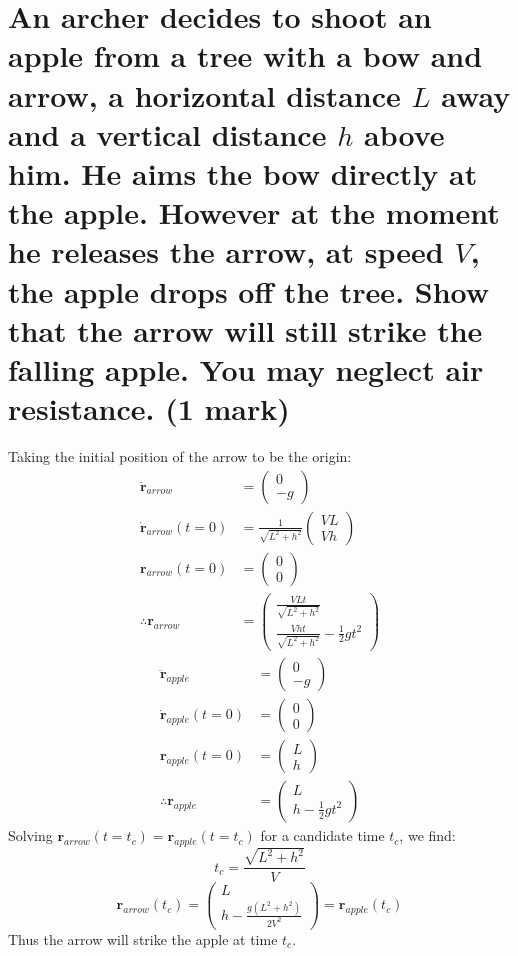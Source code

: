 \documentclass[a4paper]{scrartcl}
\begin{document}
\section{An archer decides to shoot an apple from a tree with a bow and arrow, a horizontal distance \(L\) away and a vertical distance \(h\) above him. He aims the bow directly at the apple. However at the moment he releases the arrow, at speed \(V\), the apple drops off the tree. Show that the arrow will still strike the falling apple. You may neglect air resistance. (1 mark)}
Taking the initial position of the arrow to be the origin:
\begin{align*}
    \ddot{\mathbf{r}}_{arrow} &= \begin{pmatrix} 0 \\ -g \end{pmatrix} \\
    \dot{\mathbf{r}}_{arrow}(t = 0) &= \frac{1}{\sqrt{L^2 + h^2}}\begin{pmatrix} V L \\ V h \end{pmatrix} \\
    \mathbf{r}_{arrow}(t = 0) &= \begin{pmatrix} 0 \\ 0 \end{pmatrix} \\
    \therefore \mathbf{r}_{arrow} &= \begin{pmatrix} \frac{V L t}{\sqrt{L^2 + h^2}} \\ \frac{V h t}{\sqrt{L^2 + h^2}} - \frac{1}{2} g t^2 \end{pmatrix}
\end{align*}
\begin{align*}
    \ddot{\mathbf{r}}_{apple} &= \begin{pmatrix} 0 \\ -g \end{pmatrix} \\
    \dot{\mathbf{r}}_{apple}(t = 0) &= \begin{pmatrix} 0 \\ 0 \end{pmatrix} \\
    \mathbf{r}_{apple}(t = 0) &= \begin{pmatrix} L \\ h \end{pmatrix} \\
    \therefore \mathbf{r}_{apple} &= \begin{pmatrix} L \\ h - \frac{1}{2} g t^2 \end{pmatrix}
\end{align*}
Solving \(\mathbf{r}_{arrow}(t = t_c) = \mathbf{r}_{apple}(t = t_c)\) for a candidate time \(t_c\), we find:
\[t_c = \frac{\sqrt{L^2 + h^2}}{V}\]
\[\mathbf{r}_{arrow}(t_c) = \begin{pmatrix} L \\ h - \frac{g (L^2 + h^2)}{2 V^2} \end{pmatrix} = \mathbf{r}_{apple}(t_c)\]
Thus the arrow will strike the apple at time \(t_c\).
\end{document}
